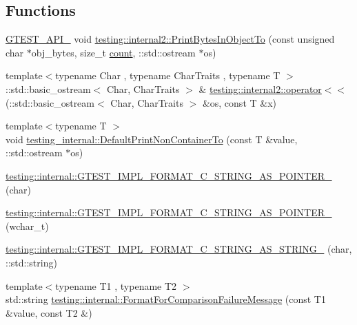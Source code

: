 \subsection*{Functions}
\begin{DoxyCompactItemize}
\item 
\mbox{\hyperlink{gtest-port_8h_aa73be6f0ba4a7456180a94904ce17790}{G\+T\+E\+S\+T\+\_\+\+A\+P\+I\+\_\+}} void \mbox{\hyperlink{namespacetesting_1_1internal2_a9fbf8e07c0f94dc74d6ef5e56cd3c553}{testing\+::internal2\+::\+Print\+Bytes\+In\+Object\+To}} (const unsigned char $\ast$obj\+\_\+bytes, size\+\_\+t \mbox{\hyperlink{gmock__stress__test_8cc_afd9db40e3361ae09188795e8cbe19752}{count}}, \+::std\+::ostream $\ast$os)
\item 
{\footnotesize template$<$typename Char , typename Char\+Traits , typename T $>$ }\\\+::std\+::basic\+\_\+ostream$<$ Char, Char\+Traits $>$ \& \mbox{\hyperlink{namespacetesting_1_1internal2_a07dbe129beb8952074f04b599dfce39b}{testing\+::internal2\+::operator$<$$<$}} (\+::std\+::basic\+\_\+ostream$<$ Char, Char\+Traits $>$ \&os, const T \&x)
\item 
{\footnotesize template$<$typename T $>$ }\\void \mbox{\hyperlink{namespacetesting__internal_a3f49d3d0c996242f9d383c850097a656}{testing\+\_\+internal\+::\+Default\+Print\+Non\+Container\+To}} (const T \&value, \+::std\+::ostream $\ast$os)
\item 
\mbox{\hyperlink{namespacetesting_1_1internal_a3682f962ae0ec1c0eca6444ca0a09e91}{testing\+::internal\+::\+G\+T\+E\+S\+T\+\_\+\+I\+M\+P\+L\+\_\+\+F\+O\+R\+M\+A\+T\+\_\+\+C\+\_\+\+S\+T\+R\+I\+N\+G\+\_\+\+A\+S\+\_\+\+P\+O\+I\+N\+T\+E\+R\+\_\+}} (char)
\item 
\mbox{\hyperlink{namespacetesting_1_1internal_a85e08f00d443221e529a0a85a90fbaeb}{testing\+::internal\+::\+G\+T\+E\+S\+T\+\_\+\+I\+M\+P\+L\+\_\+\+F\+O\+R\+M\+A\+T\+\_\+\+C\+\_\+\+S\+T\+R\+I\+N\+G\+\_\+\+A\+S\+\_\+\+P\+O\+I\+N\+T\+E\+R\+\_\+}} (wchar\+\_\+t)
\item 
\mbox{\hyperlink{namespacetesting_1_1internal_aeac30230dcc362221bdd07d61eaa4ec1}{testing\+::internal\+::\+G\+T\+E\+S\+T\+\_\+\+I\+M\+P\+L\+\_\+\+F\+O\+R\+M\+A\+T\+\_\+\+C\+\_\+\+S\+T\+R\+I\+N\+G\+\_\+\+A\+S\+\_\+\+S\+T\+R\+I\+N\+G\+\_\+}} (char, \+::std\+::string)
\item 
{\footnotesize template$<$typename T1 , typename T2 $>$ }\\std\+::string \mbox{\hyperlink{namespacetesting_1_1internal_a91ab078f10adc669f09b7f604975c518}{testing\+::internal\+::\+Format\+For\+Comparison\+Failure\+Message}} (const T1 \&value, const T2 \&)

\end{DoxyCompactItemize}
